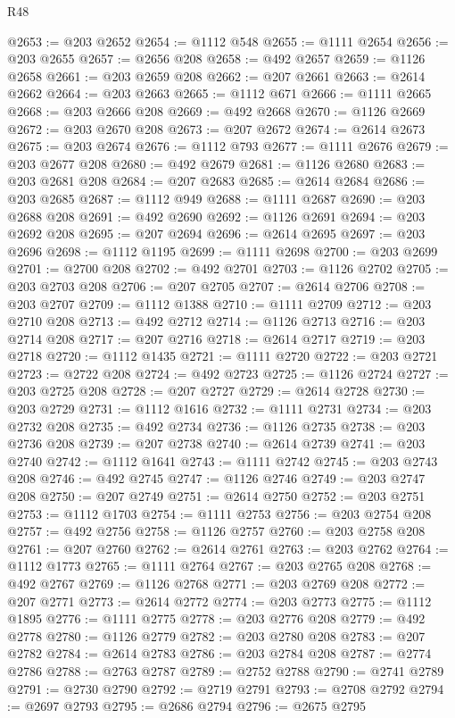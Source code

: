 \begin{lexlean}{R48}
\begin{coremodule}
@2653 := @203 @2652
@2654 := @1112 @548
@2655 := @1111 @2654
@2656 := @203 @2655
@2657 := @2656 @208
@2658 := @492 @2657
@2659 := @1126 @2658
@2661 := @203 @2659 @208
@2662 := @207 @2661
@2663 := @2614 @2662
@2664 := @203 @2663
@2665 := @1112 @671
@2666 := @1111 @2665
@2668 := @203 @2666 @208
@2669 := @492 @2668
@2670 := @1126 @2669
@2672 := @203 @2670 @208
@2673 := @207 @2672
@2674 := @2614 @2673
@2675 := @203 @2674
@2676 := @1112 @793
@2677 := @1111 @2676
@2679 := @203 @2677 @208
@2680 := @492 @2679
@2681 := @1126 @2680
@2683 := @203 @2681 @208
@2684 := @207 @2683
@2685 := @2614 @2684
@2686 := @203 @2685
@2687 := @1112 @949
@2688 := @1111 @2687
@2690 := @203 @2688 @208
@2691 := @492 @2690
@2692 := @1126 @2691
@2694 := @203 @2692 @208
@2695 := @207 @2694
@2696 := @2614 @2695
@2697 := @203 @2696
@2698 := @1112 @1195
@2699 := @1111 @2698
@2700 := @203 @2699
@2701 := @2700 @208
@2702 := @492 @2701
@2703 := @1126 @2702
@2705 := @203 @2703 @208
@2706 := @207 @2705
@2707 := @2614 @2706
@2708 := @203 @2707
@2709 := @1112 @1388
@2710 := @1111 @2709
@2712 := @203 @2710 @208
@2713 := @492 @2712
@2714 := @1126 @2713
@2716 := @203 @2714 @208
@2717 := @207 @2716
@2718 := @2614 @2717
@2719 := @203 @2718
@2720 := @1112 @1435
@2721 := @1111 @2720
@2722 := @203 @2721
@2723 := @2722 @208
@2724 := @492 @2723
@2725 := @1126 @2724
@2727 := @203 @2725 @208
@2728 := @207 @2727
@2729 := @2614 @2728
@2730 := @203 @2729
@2731 := @1112 @1616
@2732 := @1111 @2731
@2734 := @203 @2732 @208
@2735 := @492 @2734
@2736 := @1126 @2735
@2738 := @203 @2736 @208
@2739 := @207 @2738
@2740 := @2614 @2739
@2741 := @203 @2740
@2742 := @1112 @1641
@2743 := @1111 @2742
@2745 := @203 @2743 @208
@2746 := @492 @2745
@2747 := @1126 @2746
@2749 := @203 @2747 @208
@2750 := @207 @2749
@2751 := @2614 @2750
@2752 := @203 @2751
@2753 := @1112 @1703
@2754 := @1111 @2753
@2756 := @203 @2754 @208
@2757 := @492 @2756
@2758 := @1126 @2757
@2760 := @203 @2758 @208
@2761 := @207 @2760
@2762 := @2614 @2761
@2763 := @203 @2762
@2764 := @1112 @1773
@2765 := @1111 @2764
@2767 := @203 @2765 @208
@2768 := @492 @2767
@2769 := @1126 @2768
@2771 := @203 @2769 @208
@2772 := @207 @2771
@2773 := @2614 @2772
@2774 := @203 @2773
@2775 := @1112 @1895
@2776 := @1111 @2775
@2778 := @203 @2776 @208
@2779 := @492 @2778
@2780 := @1126 @2779
@2782 := @203 @2780 @208
@2783 := @207 @2782
@2784 := @2614 @2783
@2786 := @203 @2784 @208
@2787 := @2774 @2786
@2788 := @2763 @2787
@2789 := @2752 @2788
@2790 := @2741 @2789
@2791 := @2730 @2790
@2792 := @2719 @2791
@2793 := @2708 @2792
@2794 := @2697 @2793
@2795 := @2686 @2794
@2796 := @2675 @2795

\end{coremodule}
\end{lexlean}
